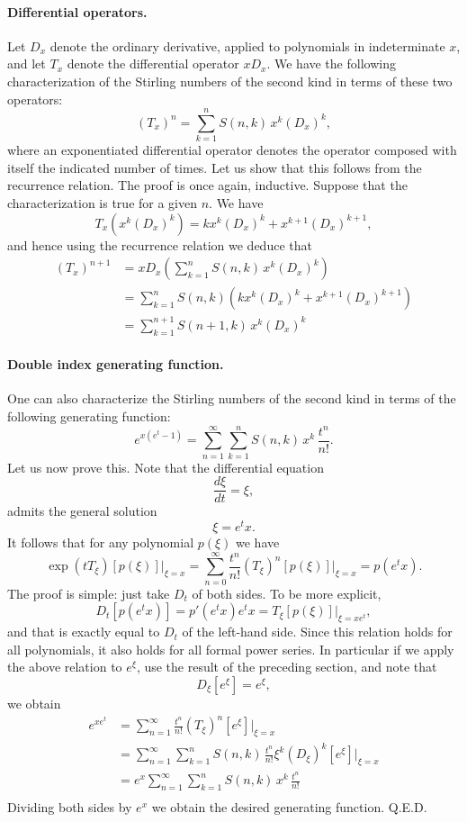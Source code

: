 \documentclass[12pt]{article}
\newcommand{\lp}{\left(}
\newcommand{\rp}{\right)}
\newcommand{\lb}{\left[}
\newcommand{\rb}{\right]}
\begin{document}
\paragraph{Differential operators.} 
Let $D_x$ denote the ordinary derivative, applied to polynomials in
indeterminate $x$, and let $T_x$ denote the differential operator
$xD_x$.  We have the following characterization of the Stirling
numbers of the second kind in terms of these two operators:
$$(T_x)^n = \sum_{k=1}^n S(n,k)\, x^k (D_x)^k,$$
where an
exponentiated differential operator denotes the operator composed with
itself the indicated number of times.  Let us show that this follows
from the recurrence relation.  The proof is once again, inductive.
Suppose that the characterization is true for a given $n$.  We have
$$T_x(x^k (D_x)^k) =  k x^k (D_x)^k + x^{k+1} (D_x)^{k+1},$$
and hence using the recurrence relation we deduce that
\begin{align*}
(T_x)^{n+1} &= xD_x\lp \sum_{k=1}^n  S(n,k)\, x^k (D_x)^k \rp \\
&= \sum_{k=1}^n S(n,k) \lp k x^k (D_x)^k + x^{k+1} (D_x)^{k+1}\rp \\
&= \sum_{k=1}^{n+1}  S(n+1,k)\, x^k (D_x)^k
\end{align*}

\paragraph{Double index generating function.}
One can also characterize the Stirling numbers of the second kind in
terms of the following  generating function:
$$e^{x(e^t-1)} = \sum_{n=1}^\infty \sum_{k=1}^n S(n,k)\,
x^k\,\frac{t^n}{n!}.$$
Let us now prove this.  Note that the differential equation
$$\frac{d\xi}{dt} = \xi,$$
admits the general solution
$$\xi = e^t x.$$
It follows that for any polynomial $p(\xi)$ we have
$$\exp(t T_\xi)[p(\xi)]\Big|_{\xi=x} = \sum_{n=0}^\infty \frac{t^n}{n!}
(T_\xi)^n[p(\xi)]\Big|_{\xi=x} = p(e^t x).$$
The proof is simple: just take $D_t$ of both sides.  To be more
explicit,
$$D_t\lb p(e^t x) \rb = p'(e^t x) e^t x =
T_\xi[p(\xi)]\Big|_{\xi=xe^t},$$
and that is exactly equal to $D_t$ of the left-hand side.  Since this
relation holds for all polynomials, it also holds for all formal power
series.  In particular if we apply the above relation to $e^\xi$, 
use the result of the preceding section, and note that
$$D_\xi[e^\xi] = e^\xi,$$
we obtain
\begin{align*}
e^{xe^t} &= \sum_{n=1}^\infty \frac{t^n}{n!} (T_\xi)^n[e^\xi] \Big|_{\xi=x} \\
&=  \sum_{n=1}^\infty \sum_{k=1}^n S(n,k)\, \frac{t^n}{n!} \xi^k
(D_\xi)^k[e^\xi] \Big|_{\xi=x} \\
&=  e^x \sum_{n=1}^\infty \sum_{k=1}^n S(n,k)\, x^k\, \frac{t^n}{n!}\\
\end{align*}
Dividing both sides by $e^x$ we obtain the desired generating
function. Q.E.D.
\end{document}
